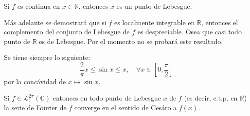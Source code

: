 \documentclass[12pt]{report}
\theoremstyle{largebreak}
\renewcommand{\leq}{\ensuremath{\leqslant}}
\begin{document}
    \begin{exa}
        Si $f$ es continua en $x\in\mathbb{R}$, entonces $x$ es un punto de Lebesgue.
    \end{exa}

    Más adelante se demostrará que si $f$ es localmente integrable en $\mathbb{R}$, entonces el complemento del conjunto de Lebesgue de $f$ es despreciable. Osea que casi todo punto de $\mathbb{R}$ es de Lebesgue. Por el momento no se probará este resultado.

    \begin{obs}
        Se tiene siempre lo siguiente:
        \begin{equation*}
            \frac{2}{\pi}x \leq \sin x\leq x,\quad\forall x\in\left[0,\frac{\pi}{2}\right]
        \end{equation*}
        por la concávidad de $x\mapsto \sin x$.
    \end{obs}

    \begin{theor}
        Si $f\in\mathcal{L}_1^{2\pi}(\mathbb{C})$ entonces en todo punto de Lebesgue $x$ de $f$ (es decir, c.t.p. en $\mathbb{R}$) la serie de Fourier de $f$ converge en el sentido de Cesáro a $f(x)$.
    \end{theor}
\end{document}
